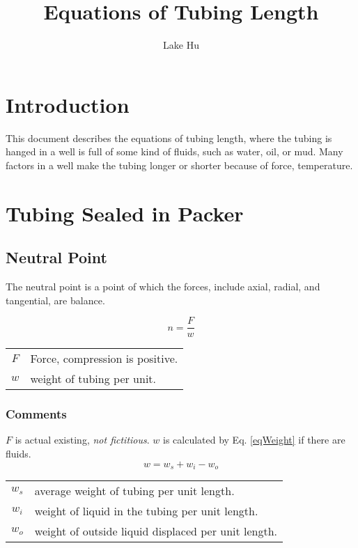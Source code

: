 \documentclass{article}
\begin{document}
\title{Equations of Tubing Length}
\author{Lake Hu}
\maketitle

\section{Introduction}
This document describes the equations of tubing length, where the tubing is
hanged in a well is full of some kind of fluids, such as water, oil, or
mud. Many factors in a well make the tubing longer or shorter because of
force, temperature.

\section{Tubing Sealed in Packer}
\subsection{Neutral Point}
The neutral point is a point of which the forces, include axial, radial,
and tangential, are balance.

\begin{equation} \label{eqNeutral}
n = \frac{F}{w}
\end{equation}
\begin{center}
\begin{tabular}{c l}
$F$ & Force, compression is positive. \\
$w$ & weight of tubing per unit. \\
\end{tabular}
\end{center}

\subsubsection{Comments}
$F$ is actual existing, \emph{not fictitious}. $w$ is calculated by Eq. \ref{eqWeight} if there are fluids.
\begin{equation} \label{eqWeight}
w = w_s + w_i - w_o
\end{equation}
\begin{center}
\begin{tabular}{c l}
$w_s$ & average weight of tubing per unit length. \\
$w_i$ & weight of liquid in the tubing per unit length. \\
$w_o$ & weight of outside liquid displaced per unit length. \\
\end{tabular}
\end{center}
\end{document}
